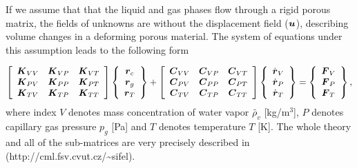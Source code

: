 If we assume that that the liquid and gas phases flow through a rigid porous 
matrix, the fields of unknowns are without the displacement field ($\mbox{\boldmath$u$}$), 
describing volume changes in a deforming porous material. 
The system of equations under this assumption leads to the following form

\begin{eqnarray}
\left[ \begin{array}{ccc}
\mbox{\boldmath$K$}_{VV} & \mbox{\boldmath$K$}_{VP} & \mbox{\boldmath$K$}_{VT} \\
\mbox{\boldmath$K$}_{PV} & \mbox{\boldmath$K$}_{PP} & \mbox{\boldmath$K$}_{PT} \\
\mbox{\boldmath$K$}_{TV} & \mbox{\boldmath$K$}_{TP} & \mbox{\boldmath$K$}_{TT}
\end{array} \right]
\left\{ \begin{array}{c}
\mbox{\boldmath$r$}_c \\
\mbox{\boldmath$r$}_g \\
\mbox{\boldmath$r$}_T
\end{array} \right\} + 
\left[ \begin{array}{ccc}
\mbox{\boldmath$C$}_{VV} & \mbox{\boldmath$C$}_{VP} & \mbox{\boldmath$C$}_{VT} \\
\mbox{\boldmath$C$}_{PV} & \mbox{\boldmath$C$}_{PP} & \mbox{\boldmath$C$}_{PT} \\
\mbox{\boldmath$C$}_{TV} & \mbox{\boldmath$C$}_{TP} & \mbox{\boldmath$C$}_{TT}
\end{array} \right]
\left\{ \begin{array}{c}
\dot{\mbox{\boldmath$r$}}_V \\
\dot{\mbox{\boldmath$r$}}_P \\
\dot{\mbox{\boldmath$r$}}_T
\end{array} \right\} = 
\left\{ \begin{array}{c}
\mbox{\boldmath$F$}_V \\
\mbox{\boldmath$F$}_P \\
\mbox{\boldmath$F$}_T
\end{array} \right\},\nonumber\\
\end{eqnarray}
where index $V$ denotes mass concentration of water vapor $\widetilde{\rho_v}$ [kg/m$^3$], 
$P$ denotes capillary gas pressure $p_g$ [Pa] and 
$T$ denotes temperature $T$ [K].
The whole theory and all of the sub-matrices are very precisely described in~\cite{glas}
(\textsf {http://cml.fsv.cvut.cz/\~{}sifel}).